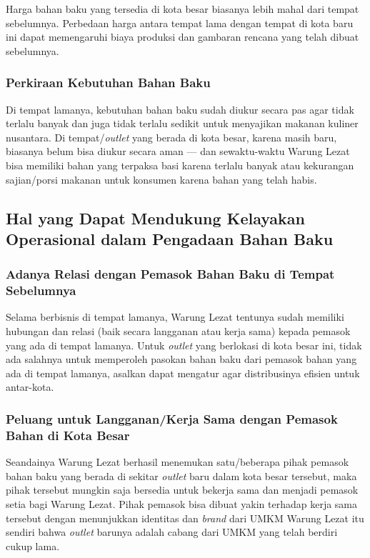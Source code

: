 Harga bahan baku yang tersedia di kota besar biasanya lebih mahal dari tempat sebelumnya. Perbedaan harga antara tempat lama dengan tempat di kota baru ini dapat memengaruhi biaya produksi dan gambaran rencana yang telah dibuat sebelumnya.

\subsubsection{Perkiraan Kebutuhan Bahan Baku}

Di tempat lamanya, kebutuhan bahan baku sudah diukur secara pas agar tidak terlalu banyak dan juga tidak terlalu sedikit untuk menyajikan makanan kuliner nusantara. Di tempat/\textit{outlet} yang berada di kota besar, karena masih baru, biasanya belum bisa diukur secara aman — dan sewaktu-waktu Warung Lezat bisa memiliki bahan yang terpaksa basi karena terlalu banyak atau kekurangan sajian/porsi makanan untuk konsumen karena bahan yang telah habis.

\subsection{Hal yang Dapat Mendukung Kelayakan Operasional dalam Pengadaan Bahan Baku}

\subsubsection{Adanya Relasi dengan Pemasok Bahan Baku di Tempat Sebelumnya}

Selama berbisnis di tempat lamanya, Warung Lezat tentunya sudah memiliki hubungan dan relasi (baik secara langganan atau kerja sama) kepada pemasok yang ada di tempat lamanya. Untuk \textit{outlet} yang berlokasi di kota besar ini, tidak ada salahnya untuk memperoleh pasokan bahan baku dari pemasok bahan yang ada di tempat lamanya, asalkan dapat mengatur agar distribusinya efisien untuk antar-kota.

\subsubsection{Peluang untuk Langganan/Kerja Sama dengan Pemasok Bahan di Kota Besar}

Seandainya Warung Lezat berhasil menemukan satu/beberapa pihak pemasok bahan baku yang berada di sekitar \textit{outlet} baru dalam kota besar tersebut, maka pihak tersebut mungkin saja bersedia untuk bekerja sama dan menjadi pemasok setia bagi Warung Lezat. Pihak pemasok bisa dibuat yakin terhadap kerja sama tersebut dengan menunjukkan identitas dan \textit{brand} dari UMKM Warung Lezat itu sendiri bahwa \textit{outlet} barunya adalah cabang dari UMKM yang telah berdiri cukup lama.

